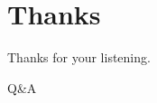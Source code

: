 \section{Thanks}
\begin{frame}
	\centering Thanks for your listening. \\
\end{frame}

\begin{frame}
	\centering Q\&A \\
\end{frame}
